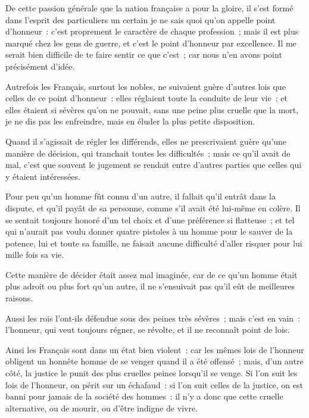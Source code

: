 \documentclass[french,twoside]{book} %
\begin{document}
\noindent De cette passion générale que la nation française a pour la gloire, il s’est formé dans l’esprit des particuliers un certain je ne sais quoi qu’on appelle point d’honneur : c’est proprement le caractère de chaque profession ; mais il est plus marqué chez les gens de guerre, et c’est le point d’honneur par excellence. Il me serait bien difficile de te faire sentir ce que c’est ; car nous n’en avons point précisément d’idée.\par
Autrefois les Français, surtout les nobles, ne suivaient guère d’autres lois que celles de ce point d’honneur : elles réglaient toute la conduite de leur vie ; et elles étaient si sévères qu’on ne pouvait, sans une peine plus cruelle que la mort, je ne dis pas les enfreindre, mais en éluder la plus petite disposition.\par
Quand il s’agissait de régler les différends, elles ne prescrivaient guère qu’une manière de décision, qui tranchait toutes les difficultés ; mais ce qu’il avait de mal, c’est que souvent le jugement se rendait entre d’autres parties que celles qui y étaient intéressées.\par
Pour peu qu’un homme fût connu d’un autre, il fallait qu’il entrât dans la dispute, et qu’il payât de sa personne, comme s’il avait été lui-même en colère. Il se sentait toujours honoré d’un tel choix et d’une préférence si flatteuse ; et tel qui n’aurait pas voulu donner quatre pistoles à un homme pour le sauver de la potence, lui et toute sa famille, ne faisait aucune difficulté d’aller risquer pour lui mille fois sa vie.\par
Cette manière de décider était assez mal imaginée, car de ce qu’un homme était plus adroit ou plus fort qu’un autre, il ne s’ensuivait pas qu’il eût de meilleures raisons.\par
Aussi les rois l’ont-ils défendue sous des peines très sévères ; mais c’est en vain : l’honneur, qui veut toujours régner, se révolte, et il ne reconnaît point de lois.\par
Ainsi les Français sont dans un état bien violent : car les mêmes lois de l’honneur obligent un honnête homme de se venger quand il a été offensé ; mais, d’un autre côté, la justice le punit des plus cruelles peines lorsqu’il se venge. Si l’on suit les lois de l’honneur, on périt sur un échafaud : si l’on suit celles de la justice, on est banni pour jamais de la société des hommes : il n’y a donc que cette cruelle alternative, ou de mourir, ou d’être indigne de vivre.\par
\end{document}
